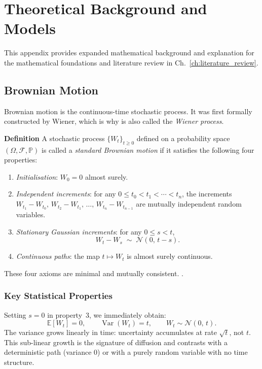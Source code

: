 \chapter{Theoretical Background and Models}
\label{app:math_foundations}

This appendix provides expanded mathematical background and explanation for the mathematical foundations and literature review in Ch.\ \ref{ch:literature_review}.

\section{Brownian Motion}
\label{app:sec:bm}

Brownian motion is the continuous-time stochastic process. It was first formally constructed by Wiener, which is why is also called the \textit{Wiener process}.

\textbf{Definition} A stochastic process $\{W_t\}_{t \geq 0}$ defined on a
probability space $(\Omega, \mathcal{F}, \mathbb{P})$ is called a
\textit{standard Brownian motion} if it satisfies the following four properties:
\begin{enumerate}
    \item \textit{Initialisation}: $W_0 = 0$ almost surely.
    \item \textit{Independent increments}: for any $0 \leq t_0 < t_1 < \cdots <
    t_n$, the increments $W_{t_1} - W_{t_0},\, W_{t_2} - W_{t_1},\, \ldots,\,
    W_{t_n} - W_{t_{n-1}}$ are mutually independent random variables.
    \item \textit{Stationary Gaussian increments}: for any $0 \leq s < t$,
    \[
        \label{eq:bm_increment}
        W_t - W_s \;\sim\; \mathcal{N}(0,\, t - s).
    \]
    \item \textit{Continuous paths}: the map $t \mapsto W_t$ is almost surely
    continuous.
\end{enumerate}

These four axioms are minimal and mutually consistent. \cite{oksendal2003stochastic}.

\subsection{Key Statistical Properties}

Setting $s = 0$ in property~3, we immediately obtain:
\[
    \mathbb{E}[W_t] = 0, \qquad \operatorname{Var}(W_t) = t, \qquad
    W_t \sim \mathcal{N}(0,\, t).
\]
The variance grows linearly in time: uncertainty accumulates at rate $\sqrt{t}$,
not $t$. This sub-linear growth is the signature of diffusion and contrasts with
a deterministic path (variance 0) or with a purely random variable with no time structure.

